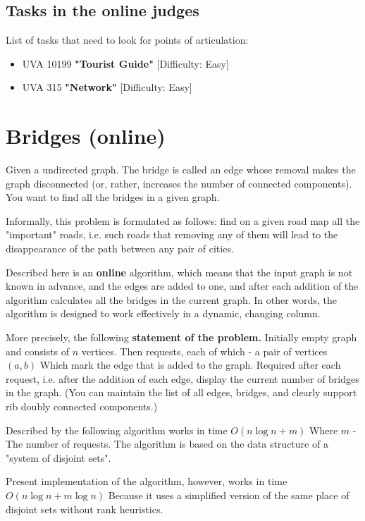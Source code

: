 \subsection{ Tasks in the online judges }

List of tasks that need to look for points of articulation:

\begin{itemize} \item UVA 10199 \textbf{"Tourist Guide"} [Difficulty: Easy] \item UVA 315 \textbf{"Network"} [Difficulty: Easy] \end{itemize}

\section{ Bridges (online) }
Given a undirected graph. The bridge is called an edge whose removal makes the graph disconnected (or, rather, increases the number of connected components). You want to find all the bridges in a given graph.

Informally, this problem is formulated as follows: find on a given road map all the "important" roads, i.e. such roads that removing any of them will lead to the disappearance of the path between any pair of cities.

Described here is an \textbf{online} algorithm, which means that the input graph is not known in advance, and the edges are added to one, and after each addition of the algorithm calculates all the bridges in the current graph. In other words, the algorithm is designed to work effectively in a dynamic, changing column.

More precisely, the following \textbf{statement of the problem.} Initially empty graph and consists of $n$ vertices. Then requests, each of which - a pair of vertices $(a, b)$ Which mark the edge that is added to the graph. Required after each request, i.e. after the addition of each edge, display the current number of bridges in the graph. (You can maintain the list of all edges, bridges, and clearly support rib doubly connected components.)

Described by the following algorithm works in time $O (n \log n + m)$ Where $m$ - The number of requests. The algorithm is based on the data structure of a "system of disjoint sets".

Present implementation of the algorithm, however, works in time $O (n \log n + m \log n)$ Because it uses a simplified version of the same place of disjoint sets without rank heuristics.

